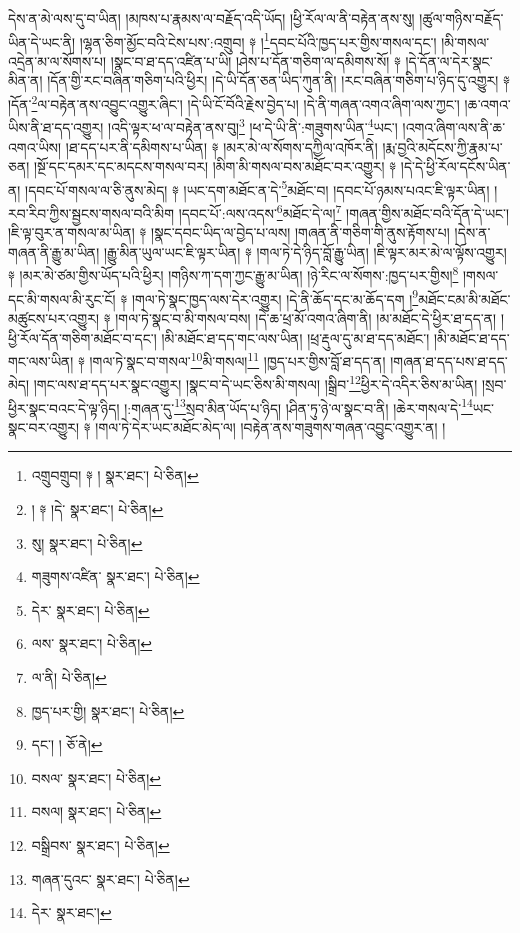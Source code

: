 དེས་ན་མེ་ལས་དུ་བ་ཡིན། །མཁས་པ་རྣམས་ལ་བརྗོད་འདི་ཡོད། །ཕྱི་རོལ་ལ་ནི་བརྟེན་ནས་སུ། །ཚུལ་གཉིས་བརྗོད་ཡིན་དེ་ཡང་ནི། །ལྷན་ཅིག་མྱོང་བའི་ངེས་པས་:འགྲུབ། ༈ །\footnote{འགྲུབགྲུབ། ༈ །  སྣར་ཐང་།  པེ་ཅིན། }དབང་པོའི་ཁྱད་པར་གྱིས་གསལ་དང་། །མི་གསལ་འདྲེན་མ་ལ་སོགས་པ། །སྣང་བ་ཐ་དད་འཛིན་པ་ཡི། །ཤེས་པ་དོན་གཅིག་ལ་དམིགས་སོ། ༈ །དེ་དོན་ལ་དེར་སྣང་མིན་ན། །དོན་གྱི་རང་བཞིན་གཅིག་པའི་ཕྱིར། །དེ་ཡི་དོན་ཅན་ཡིད་ཀུན་ནི། །རང་བཞིན་གཅིག་པ་ཉིད་དུ་འགྱུར། ༈ །དོན་\footnote{། ༈ །དེ་  སྣར་ཐང་།  པེ་ཅིན། }ལ་བརྟེན་ནས་འབྱུང་འགྱུར་ཞིང་། །དེ་ཡི་ངོ་བོའི་རྗེས་བྱེད་པ། །དེ་ནི་གཞན་འགའ་ཞིག་ལས་ཀྱང་། །ཆ་འགའ་ཡིས་ནི་ཐ་དད་འགྱུར། །འདི་ལྟར་ཕ་ལ་བརྟེན་ནས་བུ།\footnote{སུ།  སྣར་ཐང་།  པེ་ཅིན། } །ཕ་དེ་ཡི་ནི་:གཟུགས་ཡིན་\footnote{གཟུགས་འཛིན་  སྣར་ཐང་།  པེ་ཅིན། }ཡང་། །འགའ་ཞིག་ལས་ནི་ཆ་འགའ་ཡིས། །ཐ་དད་པར་ནི་དམིགས་པ་ཡིན། ༈ །མར་མེ་ལ་སོགས་དཀྱིལ་འཁོར་ནི། །རྨ་བྱའི་མདོངས་ཀྱི་རྣམ་པ་ཅན། །སྔོ་དང་དམར་དང་མདངས་གསལ་བར། །མིག་མི་གསལ་བས་མཐོང་བར་འགྱུར། ༈ །དེ་དེ་ཕྱི་རོལ་དངོས་ཡིན་ན། །དབང་པོ་གསལ་ལ་ཅི་ནུས་མེད། ༈ །ཡང་དག་མཐོང་ན་དེ་\footnote{དེར་  སྣར་ཐང་།  པེ་ཅིན། }མཐོང་བ། །དབང་པོ་ཉམས་པའང་ཇི་ལྟར་ཡིན། །རབ་རིབ་ཀྱིས་སྦྱངས་གསལ་བའི་མིག །དབང་པོ་:ལས་འདས་\footnote{ལས་  སྣར་ཐང་།  པེ་ཅིན། }མཐོང་དེ་ལ།\footnote{ལ་ནི།  པེ་ཅིན། } །གཞན་གྱིས་མཐོང་བའི་དོན་དེ་ཡང་། །ཇི་ལྟ་བུར་ན་གསལ་མ་ཡིན། ༈ །སྣང་དབང་ཡིད་ལ་བྱེད་པ་ལས། །གཞན་ནི་གཅིག་གི་ནུས་རྟོགས་པ། །དེས་ན་གཞན་ནི་རྒྱུ་མ་ཡིན། །རྒྱུ་མིན་ཡུལ་ཡང་ཇི་ལྟར་ཡིན། ༈ །གལ་ཏེ་དེ་ཉིད་བློ་རྒྱུ་ཡིན། །ཇི་ལྟར་མར་མེ་ལ་ལྟོས་འགྱུར། ༈ །མར་མེ་ཙམ་གྱིས་ཡོད་པའི་ཕྱིར། །གཉིས་ཀ་དག་ཀྱང་རྒྱུ་མ་ཡིན། །ཉེ་རིང་ལ་སོགས་:ཁྱད་པར་གྱིས།\footnote{ཁྱད་པར་གྱི།  སྣར་ཐང་།  པེ་ཅིན། } །གསལ་དང་མི་གསལ་མི་རུང་ངོ། ༈ །གལ་ཏེ་སྣང་ཁྱད་ལས་དེར་འགྱུར། །དེ་ནི་ཆོད་དང་མ་ཆོད་དག །\footnote{དང་། །  ཅོ་ནེ། }མཐོང་ངམ་མི་མཐོང་མཚུངས་པར་འགྱུར། ༈ །གལ་ཏེ་སྣང་བ་མི་གསལ་བས། །དེ་ཆ་ཕྲ་མོ་འགའ་ཞིག་ནི། །མ་མཐོང་དེ་ཕྱིར་ཐ་དད་ན། །ཕྱི་རོལ་དོན་གཅིག་མཐོང་བ་དང་། །མི་མཐོང་ཐ་དད་གང་ལས་ཡིན། །ཕྲ་རྡུལ་དུ་མ་ཐ་དད་མཐོང་། །མི་མཐོང་ཐ་དད་གང་ལས་ཡིན། ༈ །གལ་ཏེ་སྣང་བ་གསལ་\footnote{བསལ་  སྣར་ཐང་།  པེ་ཅིན། }མི་གསལ།\footnote{བསལ།  སྣར་ཐང་།  པེ་ཅིན། } །ཁྱད་པར་གྱིས་བློ་ཐ་དད་ན། །གཞན་ཐ་དད་པས་ཐ་དད་མེད། །གང་ལས་ཐ་དད་པར་སྣང་འགྱུར། །སྣང་བ་དེ་ཡང་ཅིས་མི་གསལ། །སྒྲིབ་\footnote{བསྒྲིབས་  སྣར་ཐང་།  པེ་ཅིན། }ཕྱིར་དེ་འདིར་ཅིས་མ་ཡིན། །སྲབ་ཕྱིར་སྣང་བའང་དེ་ལྟ་ཉིད། །:གཞན་དུ་\footnote{གཞན་དུའང་  སྣར་ཐང་།  པེ་ཅིན། }སྲབ་མིན་ཡོད་པ་ཉིད། །ཤིན་ཏུ་ཉེ་ལ་སྣང་བ་ནི། །ཆེར་གསལ་དེ་\footnote{དེར་  སྣར་ཐང་། }ཡང་སྣང་བར་འགྱུར། ༈ །གལ་ཏེ་དེར་ཡང་མཐོང་མེད་ལ། །བརྟེན་ནས་གཟུགས་གཞན་འབྱུང་འགྱུར་ན། །
